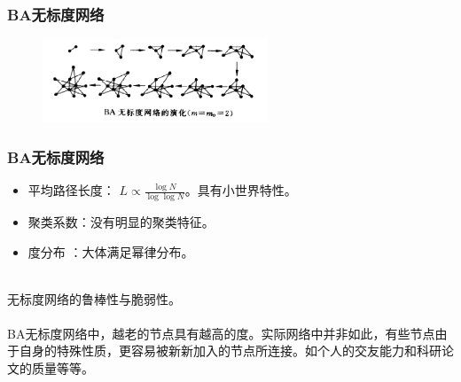 	\begin{frame}
		\frametitle{BA无标度网络}	
		\begin{center}	
		\end{center}
		\begin{figure}[htbp]
			\centering
			\includegraphics[width=0.6\textwidth, bb = 0 0 987 365]{pic/01-BA.png}
		\end{figure}
		
	\end{frame}

	\begin{frame}
		\frametitle{BA无标度网络}
		
		\begin{itemize} \itemsep=2ex
			\item 平均路径长度： $L \propto \frac{\log N}{\log \log N}$。具有小世界特性。 
			\item 聚类系数：没有明显的聚类特征。
			\item 度分布 ：大体满足幂律分布。
		\end{itemize}
		~\\
		无标度网络的鲁棒性与脆弱性。\\ ~\\ 
		BA无标度网络中，越老的节点具有越高的度。实际网络中并非如此，有些节点由于自身的特殊性质，更容易被新新加入的节点所连接。如个人的交友能力和科研论文的质量等等。\\
	\end{frame}

